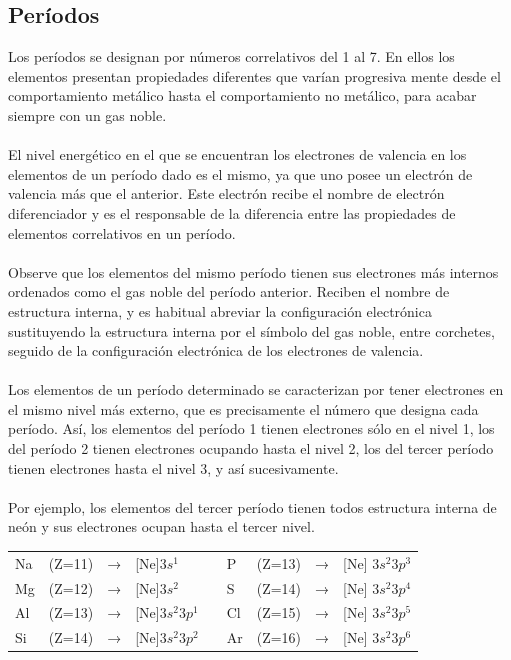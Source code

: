 \documentclass[12pt]{article}
\begin{document}
               \subsection{Períodos}\label{sec:Períodos}
                    Los períodos se designan por números correlativos del 1 al 7. En ellos los elementos presentan propiedades diferentes que varían progresiva mente desde el comportamiento metálico hasta el comportamiento no metálico, para acabar siempre con un gas noble.\\\\
                    El nivel energético en el que se encuentran los electrones de valencia en los elementos de un período dado es el mismo, ya que uno posee un electrón de valencia más que el anterior. Este electrón recibe el nombre de electrón diferenciador y es el responsable de la diferencia entre las propiedades de elementos correlativos en un período.\\\\
                    Observe que los elementos del mismo período tienen sus electrones más internos ordenados como el gas noble del período anterior. Reciben el nombre de estructura interna, y es habitual abreviar la configuración electrónica sustituyendo la estructura interna por el símbolo del gas noble, entre corchetes, seguido de la configuración electrónica de los electrones de valencia.\\\\
                    Los elementos de un período determinado se caracterizan por tener electrones en el mismo nivel más externo, que es precisamente el número que designa cada período. Así, los elementos del período 1 tienen electrones sólo en el nivel 1, los del período 2 tienen electrones ocupando hasta el nivel 2, los del tercer período tienen electrones hasta el nivel 3, y así sucesivamente.\\\\
                    Por ejemplo, los elementos del tercer período tienen todos estructura interna de neón y sus electrones ocupan hasta el tercer nivel.
                    \begin{center}
                         \begin{tabular}{llllcllll}
                              Na&(Z=11)&→&[Ne]$ 3s^1      $&     &P &(Z=13)&→&[Ne] $3s^2 3p^3 $ \\
                              Mg&(Z=12)&→&[Ne]$ 3s^2      $&     &S &(Z=14)&→&[Ne] $3s^2 3p^4 $ \\
                              Al&(Z=13)&→&[Ne]$ 3s^2 3p^1 $&     &Cl&(Z=15)&→&[Ne] $3s^2 3p^5 $\\ 
                              Si&(Z=14)&→&[Ne]$ 3s^2 3p^2 $&     &Ar&(Z=16)&→&[Ne] $3s^2 3p^6 $ \\
                         \end{tabular}
                    \end{center}
               
\end{document}
